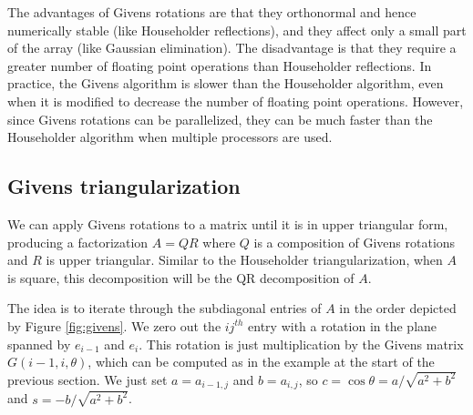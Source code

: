 The advantages of Givens rotations are that they orthonormal and hence numerically stable (like Householder reflections), and they affect only a small part of the array (like Gaussian elimination).
The disadvantage is that they require a greater number of floating point operations than Householder reflections.
In practice, the Givens algorithm is slower than the Householder algorithm, even when it is modified to decrease the number of floating point operations. 
However, since Givens rotations can be parallelized, they can be much faster than the Householder algorithm when multiple processors are used.




\subsection*{Givens triangularization}
We can apply Givens rotations to a matrix until it is in upper triangular form, producing a factorization $A = QR$ where $Q$ is a composition of Givens rotations and $R$ is upper triangular.
Similar to the Householder triangularization, when $A$ is square, this decomposition will be the QR decomposition of $A$.

The idea is to iterate through the subdiagonal entries of $A$ in the order depicted by Figure \ref{fig:givens}. 
We zero out the $ij^{th}$ entry with a rotation in the plane spanned by $e_{i-1}$ and $e_i$. 
This rotation is just multiplication by the Givens matrix $G(i-1,i,\theta)$, which can be computed as in the example at the start of the previous section. 
We just set $a=a_{i-1,j}$ and $b=a_{i,j}$, so $c = \cos \theta = a/\sqrt{a^2+b^2}$ and $s = -b/\sqrt{a^2+b^2}$.

